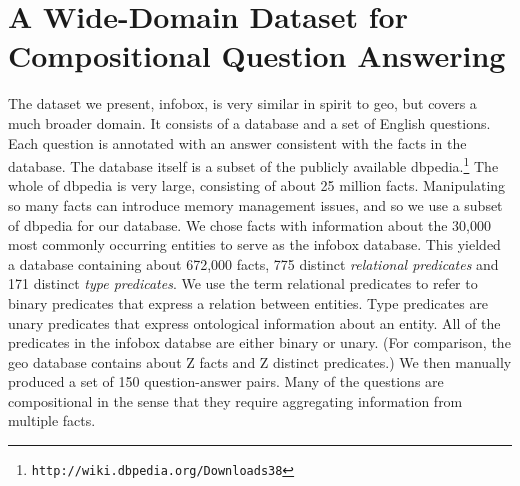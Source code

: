 \documentclass[11pt]{article}
\begin{document}
\section{A Wide-Domain Dataset for Compositional Question Answering}

The dataset we present, {\sc infobox}, is very similar in spirit to {\sc geo}, but
covers a much broader domain. It consists of a database and a set of
English questions. Each question is annotated with an answer consistent with 
the facts in the database. The database itself is a subset of the publicly 
available {\sc dbpedia}.\footnote{{\tt http://wiki.dbpedia.org/Downloads38}} 
The whole of {\sc dbpedia} is very large, consisting of about 25 million 
facts. Manipulating so many facts can introduce memory management issues, and
so we use a subset of {\sc dbpedia} for our database. We chose facts with information
about the 30,000 most commonly occurring entities to serve as the
{\sc infobox} database. This yielded a database containing about 672,000 facts,
775 distinct \emph{relational predicates} and 171 distinct \emph{type predicates}.
We use the term relational predicates to refer to binary predicates that express
a relation between entities. Type predicates are unary predicates that express
ontological information about an entity. All of the predicates in the {\sc infobox}
databse are either binary or unary.  (For comparison, the {\sc geo} database 
contains about Z 
facts and Z distinct predicates.) We then manually produced a set of 
150 question-answer pairs. Many of the
questions are compositional in the sense that they require aggregating
information from multiple facts. 
\end{document}
